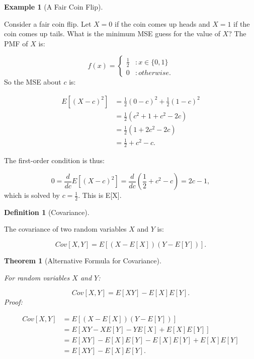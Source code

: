 \documentclass[
]{article}
\newtheorem{theorem}{Theorem}[section]
\theoremstyle{definition}
\newtheorem{definition}{Definition}[section]
\theoremstyle{definition}
\newtheorem{example}{Example}[section]
\theoremstyle{definition}
\theoremstyle{remark}
\begin{document}
\begin{example}[A Fair Coin Flip]
\protect\hypertarget{exm:unlabeled-div-79}{}\label{exm:unlabeled-div-79}

Consider a fair coin flip. Let \(X=0\) if the coin comes up heads and \(X=1\) if the coin comes up tails. What is the minimum MSE guess for the value of \(X\)? The PMF of \(X\) is:

\[
f(x) =
\begin{cases}
  \frac{1}{2} &: x \in \{0,1\} \\
  0 &: otherwise.
\end{cases}
\]
So the MSE about \(c\) is:

\begin{align}
E[(X-c)^2] &= \frac{1}{2}(0-c)^2 + \frac{1}{2}(1-c)^2 \\
           &= \frac{1}{2}(c^2 + 1 + c^2 - 2c) \\
           &= \frac{1}{2}(1 + 2c^2 - 2c) \\
           &= \frac{1}{2} + c^2 - c.
\end{align}

The first-order condition is thus:

\[0 = \frac{d}{dc}E[(X -c)^2] = \frac{d}{dc}(\frac{1}{2} + c^2 - c) = 2c - 1,\]
which is solved by \(c = \frac{1}{2}\). This is E{[}X{]}.

\end{example}

\begin{definition}[Covariance]
\protect\hypertarget{def:unlabeled-div-80}{}\label{def:unlabeled-div-80}

The covariance of two random variables \(X\) and \(Y\) is:

\[Cov[X,Y] = E[(X - E[X]) (Y - E[Y])].\]

\end{definition}

\begin{theorem}[Alternative Formula for Covariance]
\protect\hypertarget{thm:unlabeled-div-81}{}\label{thm:unlabeled-div-81}

For random variables \(X\) and \(Y\):

\[Cov[X,Y] = E[XY] - E[X]E[Y].\]
Proof:

\begin{align}
Cov[X,Y] &= E[(X - E[X]) (Y - E[Y])] \\
         &= E[XY - XE[Y] - YE[X] + E[X]E[Y]] \\
         &= E[XY] - E[X]E[Y] - E[X]E[Y] + E[X]E[Y] \\
         &= E[XY] - E[X]E[Y].
\end{align}

\end{theorem}
\end{document}
